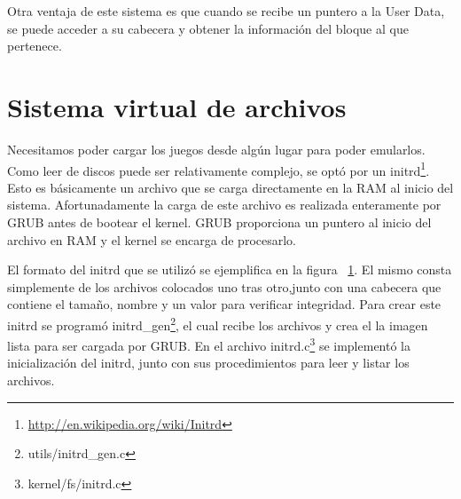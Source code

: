 Otra ventaja de este sistema es que cuando se recibe un puntero a la User Data, se puede acceder a su cabecera y obtener la información del bloque al que pertenece.

\section{Sistema virtual de archivos}\label{sec:vfs}
Necesitamos poder cargar los juegos desde algún lugar para poder emularlos. Como leer de discos puede ser relativamente complejo, se optó por un initrd\footnote{\url{http://en.wikipedia.org/wiki/Initrd}}. Esto es básicamente un archivo que se carga directamente en la RAM al inicio del sistema. Afortunadamente la carga de este archivo es realizada enteramente por GRUB antes de bootear el kernel. GRUB proporciona un puntero al inicio del archivo en RAM y el kernel se encarga de procesarlo.
\begin{figure}[H]\caption{\label{fig:initrd}}
\centering\def\svgwidth{\columnwidth}
\small
\end{figure}
 El formato del initrd que se utilizó se ejemplifica en la figura ~\ref{fig:initrd}. El mismo consta simplemente de los archivos colocados uno tras otro,junto con una cabecera que contiene el tamaño, nombre y un valor para verificar integridad.
 Para crear este initrd se programó initrd\_gen\footnote{utils/initrd\_gen.c}, el cual recibe los archivos y crea el la imagen lista para ser cargada por GRUB. En el archivo initrd.c\footnote{kernel/fs/initrd.c} se implementó la inicialización del initrd, junto con sus procedimientos para leer y listar los archivos.
 


